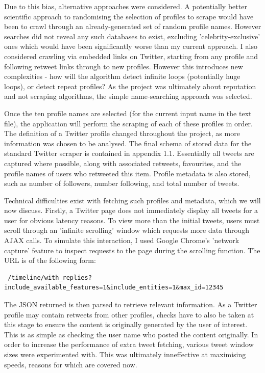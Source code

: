 Due to this bias, alternative approaches were considered. A potentially better scientific approach to randomising the selection of profiles to scrape would have been to crawl through an already-generated set of random profile names. However searches did not reveal any such databases to exist, excluding 'celebrity-exclusive' ones which would have been significantly worse than my current approach. I also considered crawling via embedded links on Twitter, starting from any profile and following retweet links through to new profiles. However this introduces new complexities - how will the algorithm detect infinite loops (potentially huge loops), or detect repeat profiles? As the project was ultimately about reputation and not scraping algorithms, the simple name-searching approach was selected. 

Once the ten profile names are selected (for the current input name in the text file), the application will perform the scraping of each of these profiles in order.  The definition of a Twitter profile changed throughout the project, as more information was chosen to be analysed. The final schema of stored data for the standard Twitter scraper is contained in appendix 1.1. Essentially all tweets are captured where possible, along with associated retweets, favourites, and the profile names of users who retweeted this item. Profile metadata is also stored, such as number of followers, number following, and total number of tweets. 

Technical difficulties exist with fetching such profiles and metadata, which we will now discuss. Firstly, a Twitter page does not immediately display all tweets for a user for obvious latency reasons. To view more than the initial tweets, users must scroll through an 'infinite scrolling' window which requests more data through AJAX calls. To simulate this interaction, I used Google Chrome's 'network capture' feature to inspect requests to the page during the scrolling function. The URL is of the following form:

\begin{verbatim}
 /timeline/with_replies?include_available_features=1&include_entities=1&max_id=12345
\end{verbatim}

\noindent The JSON returned is then parsed to retrieve relevant information. As a Twitter profile may contain retweets from other profiles, checks have to also be taken at this stage to ensure the content is originally generated by the user of interest. This is as simple as checking the user name who posted the content originally. In order to increase the performance of extra tweet fetching, various tweet window sizes were experimented with. This was ultimately inneffective at maximising speeds, reasons for which are covered now.

